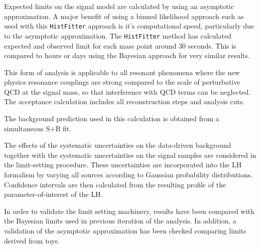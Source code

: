 Expected limits on the signal model are calculated by using an asymptotic approximation. A major benefit
of using a binned likelihood approach such as used with this \texttt{HistFitter} approach is it's
computational speed, particularly due to the asymptotic approximation.
The \texttt{HistFitter} method has calculated expected and observed limit for each mass point around 30 seconds.
This is compared to hours or days using the Bayesian approach for very similar results.
%
%
%

This form of analysis is applicable to all resonant phenomena
where the new physics resonance couplings are strong compared to the scale of perturbative QCD
at the signal mass, so that interference with QCD terms can be neglected.
The acceptance calculation includes all reconstruction steps and analysis cuts.

The background prediction used in this calculation is obtained from a
simultaneous S+B fit.

The effects of the systematic uncertainties on the data-driven background together with the systematic uncertainties
on the signal samples
are considered in the limit-setting procedure.
These uncertainties are incorporated into the LH formalism by varying all sources according
to Gaussian probability distributions.
Confidence intervals are then calculated from the resulting profile of
the parameter-of-interest of the LH.

In order to validate the limit setting machinery, results have been compared
with
the Bayesian limits used in previous iteration of the analysis. In addition, a
validation of the asymptotic approximation has been checked comparing limits
derived from toys. 
